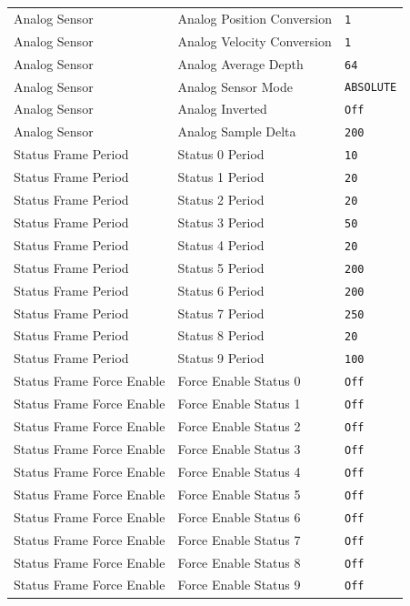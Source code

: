 \begin{longtable}{p{3.5cm} p{8cm} p{3cm}}
Analog Sensor & Analog Position Conversion & \texttt{1} \\
Analog Sensor & Analog Velocity Conversion & \texttt{1} \\
Analog Sensor & Analog Average Depth & \texttt{64} \\
Analog Sensor & Analog Sensor Mode & \texttt{ABSOLUTE} \\
Analog Sensor & Analog Inverted & \texttt{Off} \\
Analog Sensor & Analog Sample Delta & \texttt{200} \\

Status Frame Period & Status 0 Period & \texttt{10} \\
Status Frame Period & Status 1 Period & \texttt{20} \\
Status Frame Period & Status 2 Period & \texttt{20} \\
Status Frame Period & Status 3 Period & \texttt{50} \\
Status Frame Period & Status 4 Period & \texttt{20} \\
Status Frame Period & Status 5 Period & \texttt{200} \\
Status Frame Period & Status 6 Period & \texttt{200} \\
Status Frame Period & Status 7 Period & \texttt{250} \\
Status Frame Period & Status 8 Period & \texttt{20} \\
Status Frame Period & Status 9 Period & \texttt{100} \\

Status Frame Force Enable & Force Enable Status 0 & \texttt{Off} \\
Status Frame Force Enable & Force Enable Status 1 & \texttt{Off} \\
Status Frame Force Enable & Force Enable Status 2 & \texttt{Off} \\
Status Frame Force Enable & Force Enable Status 3 & \texttt{Off} \\
Status Frame Force Enable & Force Enable Status 4 & \texttt{Off} \\
Status Frame Force Enable & Force Enable Status 5 & \texttt{Off} \\
Status Frame Force Enable & Force Enable Status 6 & \texttt{Off} \\
Status Frame Force Enable & Force Enable Status 7 & \texttt{Off} \\
Status Frame Force Enable & Force Enable Status 8 & \texttt{Off} \\
Status Frame Force Enable & Force Enable Status 9 & \texttt{Off} \\



\bottomrule
\end{longtable}